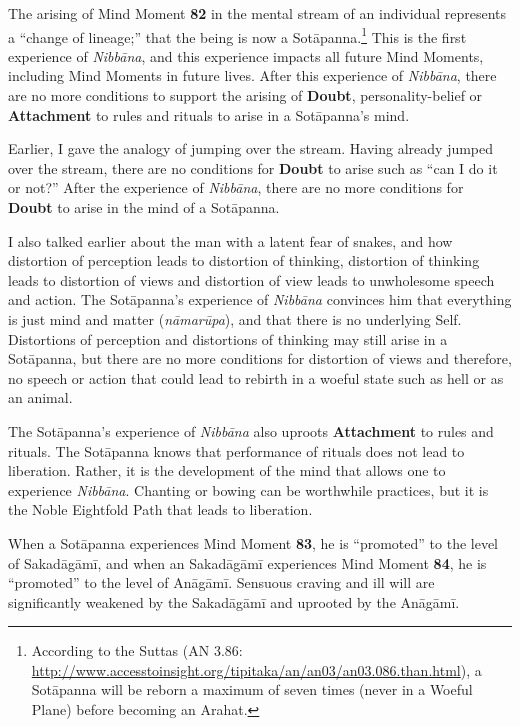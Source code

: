 The arising of Mind Moment \textbf{82} in the mental stream of an individual represents a “change of lineage;” that the being is now a Sotāpanna.\footnote{According to the Suttas (AN 3.86: \url{http://www.accesstoinsight.org/tipitaka/an/an03/an03.086.than.html}), a Sotāpanna will be reborn a maximum of seven times (never in a Woeful Plane) before becoming an Arahat.} This is the first experience of \textit{Nibbāna}, and this experience impacts all future Mind Moments, including Mind Moments in future lives. After this experience of \textit{Nibbāna}, there are no more conditions to support the arising of \textbf{Doubt}, personality-belief or \textbf{Attachment} to rules and rituals to arise in a Sotāpanna’s mind.

\pagebreak

Earlier, I gave the analogy of jumping over the stream. Having already jumped over the stream, there are no conditions for \textbf{Doubt} to arise such as “can I do it or not?” After the experience of \textit{Nibbāna}, there are no more conditions for \textbf{Doubt} to arise in the mind of a Sotāpanna.

I also talked earlier about the man with a latent fear of snakes, and how distortion of perception leads to distortion of thinking, distortion of thinking leads to distortion of views and distortion of view leads to unwholesome speech and action. The Sotāpanna’s experience of \textit{Nibbāna} convinces him that everything is just mind and matter (\textit{nāmarūpa}), and that there is no underlying Self. Distortions of perception and distortions of thinking may still arise in a Sotāpanna, but there are no more conditions for distortion of views and therefore, no speech or action that could lead to rebirth in a woeful state such as hell or as an animal.

The Sotāpanna’s experience of \textit{Nibbāna} also uproots \textbf{Attachment} to rules and rituals. The Sotāpanna knows that performance of rituals does not lead to liberation. Rather, it is the development of the mind that allows one to experience \textit{Nibbāna}. Chanting or bowing can be worthwhile practices, but it is the Noble Eightfold Path that leads to liberation.

When a Sotāpanna experiences Mind Moment \textbf{83}, he is “promoted” to the level of Sakadāgāmī, and when an Sakadāgāmī experiences Mind Moment \textbf{84}, he is “promoted” to the level of Anāgāmī. Sensuous craving and ill will are significantly weakened by the Sakadāgāmī and uprooted by the Anāgāmī. 

